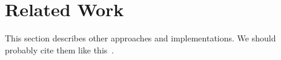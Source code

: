 \section{Related Work}
\label{sec:related}
This section describes other approaches and implementations.
We should probably cite them like this~\cite{Authors14}.
